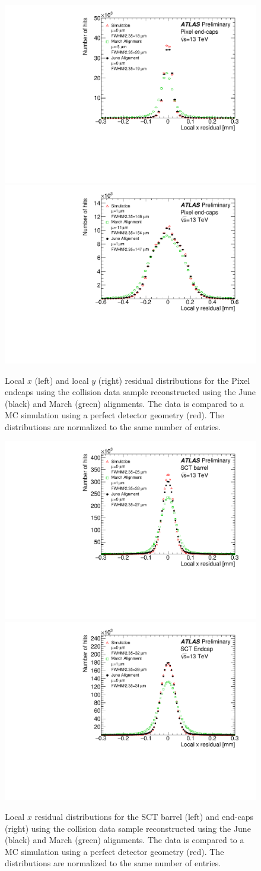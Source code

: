 \begin{figure}[htbp]
  \centering
  \includegraphics[width=.48\textwidth]{figs/alignment/align2015/PIXECX}
  \includegraphics[width=.48\textwidth]{figs/alignment/align2015/PIXECY}
  \caption{Local $x$ (left) and local $y$ (right) residual distributions for the Pixel endcaps using the  collision data sample reconstructed using the June (black) and March (green) alignments.  The data is compared to a MC simulation using a perfect detector geometry (red).  The distributions are normalized to the same number of entries.}
  \label{fig:align_2015_results_pixec}
\end{figure}

\begin{figure}[htbp]
  \centering
  \includegraphics[width=.48\textwidth]{figs/alignment/align2015/SCTX}
  \includegraphics[width=.48\textwidth]{figs/alignment/align2015/SCTECX}
  \caption{Local $x$ residual distributions for the SCT barrel (left) and end-caps (right) using the  collision data sample reconstructed using the June (black) and March (green) alignments.  The data is compared to a MC simulation using a perfect detector geometry (red).  The distributions are normalized to the same number of entries.}
  \label{fig:align_2015_results_sct}
\end{figure}

